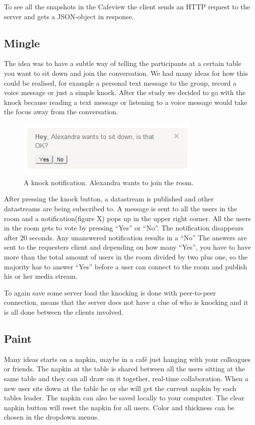 \documentclass[12pt, titlepage]{article}
\begin{document}
To see all the snapshots in the Cafeview the client sends an HTTP request to the server and gets a JSON-object in response.
\subsection{Mingle}
The idea was to have a subtle way of telling the participants at a certain table you want to sit down and join the conversation. We had many ideas for how this could be realised, for example a personal text message to the group, record a voice message or just a simple knock. After the study we decided to go with the knock because reading a text message or listening to a voice message would take the focus away from the conversation. 
\begin{figure}[H]
  \centering
	\includegraphics[width=0.8\textwidth,keepaspectratio]{knock.png}
  \caption{A knock notification. Alexandra wants to join the room.}
\end{figure}
After pressing the knock button, a datastream is published and other datastreams are being subscribed to. A message is sent to all the users in the room and a notification(figure X) pops up in the upper right corner. All the users in the room gets to vote by pressing “Yes” or “No”. The notification disappears after 20 seconds. Any unanswered notification results in a “No” The answers are sent to the requesters client and depending on how many “Yes”, you have to have more than the total amount of users in the room divided by two plus one, so the majority has to answer “Yes” before a user can connect to the room and publish his or her media stream.

To again save some server load the knocking is done with peer-to-peer connection, means that the server does not have a clue of who is knocking and it is all done between the clients involved.
\subsection{Paint}
Many ideas starts on a napkin, maybe in a café just hanging with your colleagues or friends. The napkin at the table is shared between all the users sitting at the same table and they can all draw on it together, real-time collaboration. When a new user sits down at the table he or she will get the current napkin by each tables leader. The napkin can also be saved locally to your computer. The clear napkin button will reset the napkin for all users. Color and thickness can be chosen in the dropdown menus.
\end{document}

